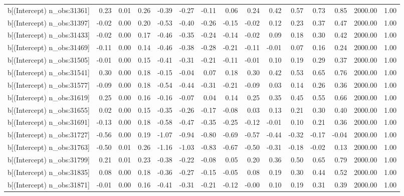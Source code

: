 \begin{table}[ht]
\begin{tabular}{rrrrrrrrrrrrrrr}
  b[(Intercept) n\_obs:31361] & 0.23 & 0.01 & 0.26 & -0.39 & -0.27 & -0.11 & 0.06 & 0.24 & 0.42 & 0.57 & 0.73 & 0.85 & 2000.00 & 1.00 \\ 
  b[(Intercept) n\_obs:31397] & -0.02 & 0.00 & 0.20 & -0.53 & -0.40 & -0.26 & -0.15 & -0.02 & 0.12 & 0.23 & 0.37 & 0.47 & 2000.00 & 1.00 \\ 
  b[(Intercept) n\_obs:31433] & -0.02 & 0.00 & 0.17 & -0.46 & -0.35 & -0.24 & -0.14 & -0.02 & 0.09 & 0.18 & 0.30 & 0.42 & 2000.00 & 1.00 \\ 
  b[(Intercept) n\_obs:31469] & -0.11 & 0.00 & 0.14 & -0.46 & -0.38 & -0.28 & -0.21 & -0.11 & -0.01 & 0.07 & 0.16 & 0.24 & 2000.00 & 1.00 \\ 
  b[(Intercept) n\_obs:31505] & -0.01 & 0.00 & 0.15 & -0.41 & -0.31 & -0.21 & -0.11 & -0.01 & 0.10 & 0.19 & 0.29 & 0.37 & 2000.00 & 1.00 \\ 
  b[(Intercept) n\_obs:31541] & 0.30 & 0.00 & 0.18 & -0.15 & -0.04 & 0.07 & 0.18 & 0.30 & 0.42 & 0.53 & 0.65 & 0.76 & 2000.00 & 1.00 \\ 
  b[(Intercept) n\_obs:31577] & -0.09 & 0.00 & 0.18 & -0.54 & -0.44 & -0.31 & -0.21 & -0.09 & 0.03 & 0.14 & 0.26 & 0.36 & 2000.00 & 1.00 \\ 
  b[(Intercept) n\_obs:31619] & 0.25 & 0.00 & 0.16 & -0.16 & -0.07 & 0.04 & 0.14 & 0.25 & 0.35 & 0.45 & 0.55 & 0.66 & 2000.00 & 1.00 \\ 
  b[(Intercept) n\_obs:31655] & 0.02 & 0.00 & 0.15 & -0.35 & -0.26 & -0.17 & -0.08 & 0.03 & 0.13 & 0.21 & 0.30 & 0.40 & 2000.00 & 1.00 \\ 
  b[(Intercept) n\_obs:31691] & -0.13 & 0.00 & 0.18 & -0.58 & -0.47 & -0.35 & -0.25 & -0.12 & -0.01 & 0.10 & 0.21 & 0.36 & 2000.00 & 1.00 \\ 
  b[(Intercept) n\_obs:31727] & -0.56 & 0.00 & 0.19 & -1.07 & -0.94 & -0.80 & -0.69 & -0.57 & -0.44 & -0.32 & -0.17 & -0.04 & 2000.00 & 1.00 \\ 
  b[(Intercept) n\_obs:31763] & -0.50 & 0.01 & 0.26 & -1.16 & -1.03 & -0.83 & -0.67 & -0.50 & -0.31 & -0.18 & -0.02 & 0.13 & 2000.00 & 1.00 \\ 
  b[(Intercept) n\_obs:31799] & 0.21 & 0.01 & 0.23 & -0.38 & -0.22 & -0.08 & 0.05 & 0.20 & 0.36 & 0.50 & 0.65 & 0.79 & 2000.00 & 1.00 \\ 
  b[(Intercept) n\_obs:31835] & 0.08 & 0.00 & 0.18 & -0.36 & -0.27 & -0.15 & -0.05 & 0.08 & 0.19 & 0.30 & 0.44 & 0.52 & 2000.00 & 1.00 \\ 
  b[(Intercept) n\_obs:31871] & -0.01 & 0.00 & 0.16 & -0.41 & -0.31 & -0.21 & -0.12 & -0.00 & 0.10 & 0.19 & 0.31 & 0.39 & 2000.00 & 1.00 \\ 

\end{tabular}
\end{table}
